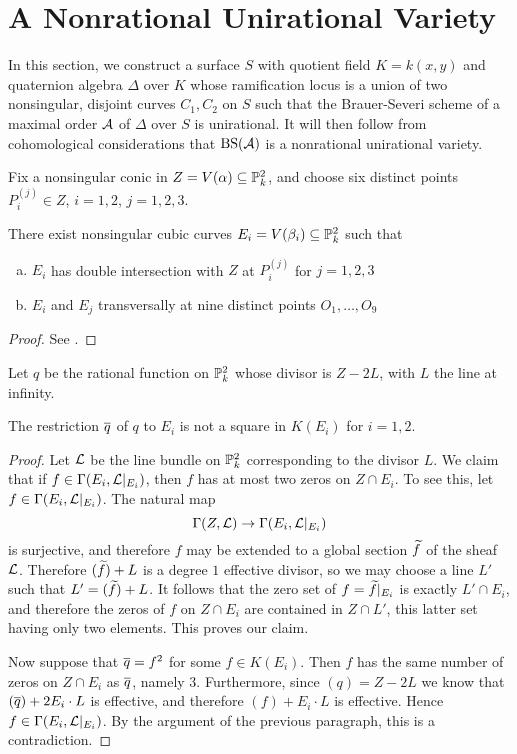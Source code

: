 \section{A Nonrational Unirational Variety}
In this section, we construct a surface $S$ with quotient field $K = k(x,y)$ and quaternion algebra $\Delta$ over $K$ whose ramification locus is a union of two nonsingular, disjoint curves $C_1,C_2$ on $S$ such that the Brauer-Severi scheme of a maximal order $\mathcal{A}$ of $\Delta$ over $S$ is unirational.  It will then follow from cohomological considerations that $\textnormal{BS}(\mathcal{A})$ is a nonrational unirational variety.

Fix a nonsingular conic in $Z = V(\alpha)\subseteq \mathbb{P}^2_k$, and choose six distinct points $P_i^{(j)}\in Z$, $i=1,2$, $j=1,2,3$.
\begin{lem}
There exist nonsingular cubic curves $E_i = V(\beta_i) \subseteq \mathbb{P}^2_k$ such that
\begin{enumerate}[(a)]
\item  $E_i$ has double intersection with $Z$ at $P_i^{(j)}$ for $j=1,2,3$
\item  $E_i$ and $E_j$ transversally at nine distinct points $O_1,\dots,O_9$
\end{enumerate}
\end{lem}
\begin{proof}
See \cite{artin1972some}.
\end{proof}

Let $q$ be the rational function on $\mathbb{P}^2_k$ whose divisor is $Z-2L$, with $L$ the line at infinity.
\begin{lem}
The restriction $\overline{q}$ of $q$ to $E_i$ is not a square in $K(E_i)$ for $i=1,2$.
\end{lem}
\begin{proof}
Let $\mathcal{L}$ be the line bundle on $\mathbb{P}^2_k$ corresponding to the divisor $L$.  We claim that if $f\in \Gamma(E_i,\mathcal{L}|_{E_i})$, then $f$ has at most two zeros on $Z\cap E_i$.  To see this, let $f\in \Gamma(E_i,\mathcal{L}|_{E_i})$.  The natural map
$$\Gamma(Z,\mathcal{L})\rightarrow\Gamma(E_i,\mathcal{L}|_{E_i})$$
is surjective, and therefore $f$ may be extended to a global section $\widetilde f$ of the sheaf $\mathcal{L}$.  Therefore $(\widetilde f) + L$ is a degree $1$ effective divisor, so we may choose a line $L'$ such that $L' = (\widetilde f) + L$.  It follows that the zero set of $f = \widetilde f|_{E_i}$ is exactly $L'\cap E_i$, and therefore the zeros of $f$ on $Z\cap E_i$ are contained in $Z\cap L'$, this latter set having only two elements.  This proves our claim.

Now suppose that $\overline{q} = f^2$ for some $f\in K(E_i)$.  Then $f$ has the same number of zeros on $Z\cap E_i$ as $\overline{q}$, namely $3$.  Furthermore, since $(q) = Z-2L$ we know that $(\overline{q}) + 2E_i\cdot L$ is effective, and therefore $(f) + E_i\cdot L$ is effective.  Hence $f\in \Gamma(E_i,\mathcal{L}|_{E_i})$.  By the argument of the previous paragraph, this is a contradiction.
\end{proof}

